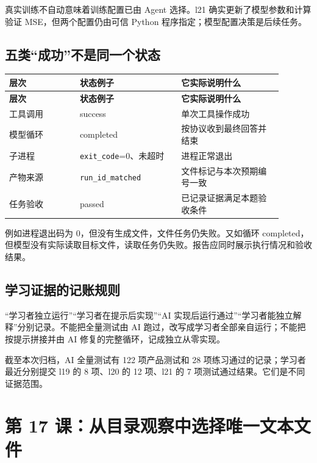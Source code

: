 真实训练不自动意味着训练配置已由 Agent 选择。l21 确实更新了模型参数和计算验证 MSE，但两个配置仍由可信 Python 程序指定；模型配置决策是后续任务。

\subsection{五类“成功”不是同一个状态}

{\small\setlength{\tabcolsep}{4pt}
\renewcommand{\arraystretch}{1.25}
\begin{longtable}{>{\raggedright\arraybackslash}p{0.23\linewidth}>{\raggedright\arraybackslash}p{0.33\linewidth}>{\raggedright\arraybackslash}p{0.33\linewidth}}
\toprule
\textbf{层次} & \textbf{状态例子} & \textbf{它实际说明什么} \\
\midrule\endfirsthead
\toprule
\textbf{层次} & \textbf{状态例子} & \textbf{它实际说明什么} \\
\midrule\endhead
\bottomrule\endfoot
工具调用 & success & 单次工具操作成功 \\
模型循环 & completed & 按协议收到最终回答并结束 \\
子进程 & \nolinkurl{exit_code}=0、未超时 & 进程正常退出 \\
产物来源 & \nolinkurl{run_id_matched} & 文件标记与本次预期编号一致 \\
任务验收 & passed & 已记录证据满足本题验收条件 \\
\end{longtable}}

例如进程退出码为 0，但没有生成文件，文件任务仍失败。又如循环 completed，但模型没有实际读取目标文件，读取任务仍失败。报告应同时展示执行情况和验收结果。

\subsection{学习证据的记账规则}

“学习者独立运行”“学习者在提示后实现”“AI 实现后运行通过”“学习者能独立解释”分别记录。不能把全量测试由 AI 跑过，改写成学习者全部亲自运行；不能把按提示拼接并由 AI 修复的完整循环，记成独立从零实现。

截至本次归档，AI 全量测试有 122 项产品测试和 28 项练习通过的记录；学习者最近分别提交 l19 的 8 项、l20 的 12 项、l21 的 7 项测试通过结果。它们是不同证据范围。

\section{第 17 课：从目录观察中选择唯一文本文件}

